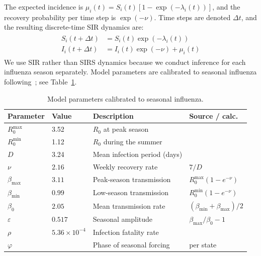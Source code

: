 \documentclass[11pt]{article}
\begin{document}
The expected incidence is $\mu_i(t) = S_i(t)[1 -
  \exp(-\lambda_i(t))]$, and the recovery probability per time step is
$\exp(-\nu)$. Time steps are denoted $\Delta t$, and the resulting
discrete-time SIR dynamics are:
\begin{align}\begin{split}\label{eq:discrete_sir}
S_i(t+\Delta t) &= S_i(t) \exp(-\lambda_i(t)) \\
I_i(t+ \Delta t) &= I_i(t) \exp(-\nu) + \mu_i(t)
\end{split}\end{align}
We use SIR rather than SIRS dynamics because we conduct inference for
each influenza season separately. Model parameters are calibrated to
seasonal influenza following~\citep{shaman2010, rolfes2018}; see
Table~\ref{tab:params}.

\begin{table}[h]
\centering
\begin{tabular}{llll}
\toprule
Parameter & Value & Description & Source / calc.\\
\midrule
$R^{\text{max}}_0$ & 3.52 & $R_0$ at peak season & \citep{shaman2010} \\
$R^{\text{min}}_0$ & 1.12 & $R_0$ during the summer & \citep{shaman2010} \\
$D$ & 3.24 & Mean infection period (days) & \citep{shaman2010} \\
$\nu$ & $2.16$ & Weekly recovery rate & $7 / D$ \\
$\beta_{\text{max}}$ & $3.11$ & Peak-season transmission & $R_0^{\text{max}}(1 - e^{-\nu})$\\
$\beta_{\text{min}}$ & $0.99$ & Low-season transmission & $R_0^{\text{min}}(1 - e^{-\nu})$ \\
$\beta_0$ & $2.05$ & Mean transmission rate & $(\beta_{\text{min}} + \beta_{\text{max}})/2$ \\
$\varepsilon$ & $0.517$ & Seasonal amplitude & $\beta_{\text{max}} / \beta_0 - 1$\\
$\rho$ & $5.36 \times 10^{-4}$ & Infection fatality rate & \citep{rolfes2018}\\
$\varphi$ & & Phase of seasonal forcing & per state \\
\bottomrule
\end{tabular}
\caption{Model parameters calibrated to seasonal influenza.}
\label{tab:params}
\end{table}
\end{document}
